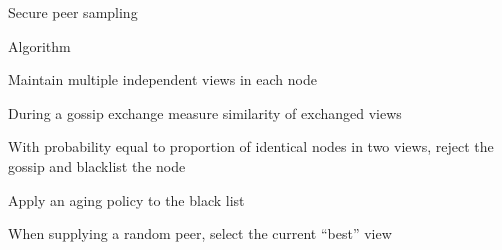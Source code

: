 \begin{frame}{Secure peer sampling}
	
\begin{block}{Algorithm}
\BI
\item Maintain multiple independent views in each node
\item During a gossip exchange measure similarity of exchanged views
\item With probability equal to proportion of identical nodes in two views, reject the gossip and blacklist the node
\item Apply an aging policy to the black list
\item When supplying a random peer, select the current “best” view
\EI
\end{block}

\begin{Bib}
\end{Bib}
	
\end{frame}

